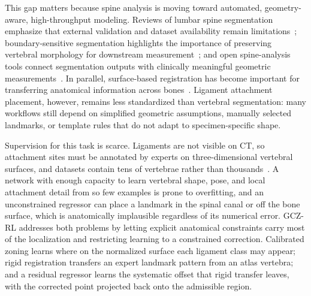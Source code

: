 \documentclass[5p,times,twocolumn,authoryear]{elsarticle}
\newif\ifhighlight
\newcommand{\rev}[1]{\ifhighlight{\color{revcolor}#1}\else#1\fi}
\begin{document}
This gap matters because spine analysis is moving toward automated, geometry-aware, high-throughput modeling. Reviews of lumbar spine segmentation emphasize that external validation and dataset availability remain limitations~\citep{mendes2026lumbarreview}; boundary-sensitive segmentation highlights the importance of preserving vertebral morphology for downstream measurement~\citep{ji2026bsnet}; and open spine-analysis tools connect segmentation outputs with clinically meaningful geometric measurements~\citep{kowlagi2026olsia}. In parallel, surface-based registration has become important for transferring anatomical information across bones~\citep{wu2025neuralbonereg}. Ligament attachment placement, however, remains less standardized than vertebral segmentation: many workflows still depend on simplified geometric assumptions, manually selected landmarks, or template rules that do not adapt to specimen-specific shape.

Supervision for this task is scarce. Ligaments are not visible on CT, so attachment sites must be annotated by experts on three-dimensional vertebral surfaces, and datasets contain tens of vertebrae rather than thousands\rev{~\citep{kramer2024,blomenkamp2026sld}}. A network with enough capacity to learn vertebral shape, pose, and local attachment detail from so few examples is prone to overfitting, and an unconstrained regressor can place a landmark in the spinal canal or off the bone surface, which is anatomically implausible regardless of its numerical error. GCZ-RL addresses both problems by letting explicit anatomical constraints carry most of the localization and restricting learning to a constrained correction. Calibrated zoning learns where on the normalized surface each ligament class may appear; rigid registration transfers an expert landmark pattern from an atlas vertebra; and a residual regressor learns the systematic offset that rigid transfer leaves, with the corrected point projected back onto the admissible region.
\end{document}
